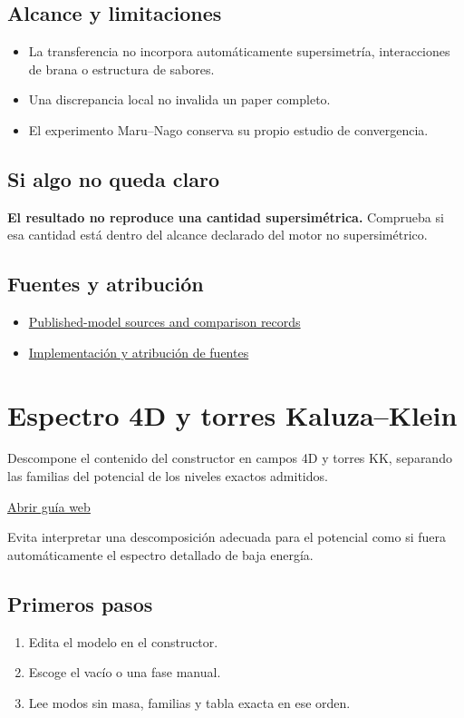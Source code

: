 \documentclass[11pt,a4paper]{article}
\begin{document}
\subsection*{Alcance y limitaciones}
\begin{itemize}
\item La transferencia no incorpora automáticamente supersimetría, interacciones de brana o estructura de sabores.
\item Una discrepancia local no invalida un paper completo.
\item El experimento Maru--Nago conserva su propio estudio de convergencia.
\end{itemize}
\subsection*{Si algo no queda claro}
\textbf{El resultado no reproduce una cantidad supersimétrica.} Comprueba si esa cantidad está dentro del alcance declarado del motor no supersimétrico.

\subsection*{Fuentes y atribución}
\begin{itemize}
\item \href{https://github.com/karlesmarin/ghu-lab/blob/main/src/modules/papers.mjs}{Published-model sources and comparison records}
\item \href{https://github.com/karlesmarin/ghu-lab/blob/main/src/sections/papers_section.js}{Implementación y atribución de fuentes}
\end{itemize}
\section{Espectro 4D y torres Kaluza--Klein}
Descompone el contenido del constructor en campos 4D y torres KK, separando las familias del potencial de los niveles exactos admitidos.

\href{https://karlesmarin.github.io/ghu-explorer/guide/es/spectrum5d/index.html}{Abrir guía web}

Evita interpretar una descomposición adecuada para el potencial como si fuera automáticamente el espectro detallado de baja energía.
\subsection*{Primeros pasos}
\begin{enumerate}
\item Edita el modelo en el constructor.
\item Escoge el vacío o una fase manual.
\item Lee modos sin masa, familias y tabla exacta en ese orden.
\end{enumerate}
\end{document}
